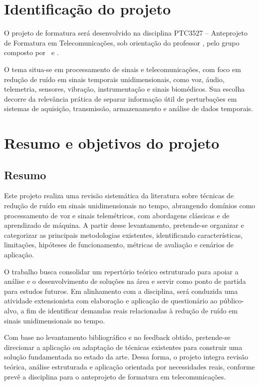 \clearpage

\tableofcontents
\newpage

\section{Identificação do projeto}

O projeto de formatura \textit{\tituloProjeto} será desenvolvido na disciplina PTC3527 -- Anteprojeto de Formatura em Telecomunicações, sob orientação do professor \orientadorProjeto, pelo grupo composto por \alunoA\ e \alunoB.

O tema situa-se em processamento de sinais e telecomunicações, com foco em redução de ruído em sinais temporais unidimensionais, como voz, áudio, telemetria, sensores, vibração, instrumentação e sinais biomédicos. Sua escolha decorre da relevância prática de separar informação útil de perturbações em sistemas de aquisição, transmissão, armazenamento e análise de dados temporais.

\section{Resumo e objetivos do projeto}

\subsection{Resumo}

Este projeto realiza uma revisão sistemática da literatura sobre técnicas de redução de ruído em sinais unidimensionais no tempo, abrangendo domínios como processamento de voz e sinais telemétricos, com abordagens clássicas e de aprendizado de máquina. A partir desse levantamento, pretende-se organizar e categorizar as principais metodologias existentes, identificando características, limitações, hipóteses de funcionamento, métricas de avaliação e cenários de aplicação.

O trabalho busca consolidar um repertório teórico estruturado para apoiar a análise e o desenvolvimento de soluções na área e servir como ponto de partida para estudos futuros. Em alinhamento com a disciplina, será conduzida uma atividade extensionista com elaboração e aplicação de questionário ao público-alvo, a fim de identificar demandas reais relacionadas à redução de ruído em sinais unidimensionais no tempo.

Com base no levantamento bibliográfico e no feedback obtido, pretende-se direcionar a aplicação ou adaptação de técnicas existentes para construir uma solução fundamentada no estado da arte. Dessa forma, o projeto integra revisão teórica, análise estruturada e aplicação orientada por necessidades reais, conforme prevê a disciplina para o anteprojeto de formatura em telecomunicações.

